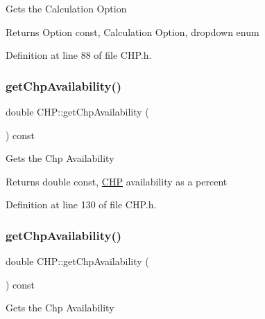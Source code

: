 Gets the Calculation Option

\begin{DoxyReturn}{Returns}
Option const, Calculation Option, dropdown enum 
\end{DoxyReturn}


Definition at line 88 of file C\+H\+P.\+h.

\mbox{\label{class_c_h_p_abd1ea13cd48f5af48799891a52634340}} 
\subsubsection{\texorpdfstring{get\+Chp\+Availability()}{getChpAvailability()}\hspace{0.1cm}{\footnotesize\ttfamily [1/3]}}
{\footnotesize\ttfamily double C\+H\+P\+::get\+Chp\+Availability (\begin{DoxyParamCaption}{ }\end{DoxyParamCaption}) const\hspace{0.3cm}{\ttfamily [inline]}}

Gets the Chp Availability

\begin{DoxyReturn}{Returns}
double const, \hyperlink{class_c_h_p}{C\+HP} availability as a percent 
\end{DoxyReturn}


Definition at line 130 of file C\+H\+P.\+h.

\mbox{\label{class_c_h_p_abd1ea13cd48f5af48799891a52634340}} 
\subsubsection{\texorpdfstring{get\+Chp\+Availability()}{getChpAvailability()}\hspace{0.1cm}{\footnotesize\ttfamily [2/3]}}
{\footnotesize\ttfamily double C\+H\+P\+::get\+Chp\+Availability (\begin{DoxyParamCaption}{ }\end{DoxyParamCaption}) const\hspace{0.3cm}{\ttfamily [inline]}}

Gets the Chp Availability

